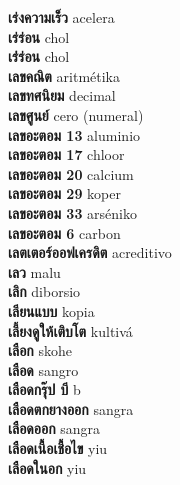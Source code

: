 \textbf{ เร่งความเร็ว  } acelera \\
\textbf{ เร่ร่อน  } chol \\
\textbf{ เร่่ร่อน  } chol \\
\textbf{ เลขคณิต  } aritmétika \\
\textbf{ เลขทศนิยม  } decimal \\
\textbf{ เลขศูนย์  } cero (numeral) \\
\textbf{ เลขอะตอม 13  } aluminio \\
\textbf{ เลขอะตอม 17  } chloor \\
\textbf{ เลขอะตอม 20  } calcium \\
\textbf{ เลขอะตอม 29  } koper \\
\textbf{ เลขอะตอม 33  } arséniko \\
\textbf{ เลขอะตอม 6  } carbon \\
\textbf{ เลตเตอร์ออฟเครดิต  } acreditivo \\
\textbf{ เลว  } malu \\
\textbf{ เลิก  } diborsio \\
\textbf{ เลียนแบบ  } kopia \\
\textbf{ เลี้ยงดูให้เติบโต  } kultivá \\
\textbf{ เลือก  } skohe \\
\textbf{ เลือด  } sangro \\
\textbf{ เลือดกรุ๊ป บี  } b \\
\textbf{ เลือดตกยางออก  } sangra \\
\textbf{ เลือดออก  } sangra \\
\textbf{ เลือดเนื้อเชื้อไข  } yiu \\
\textbf{ เลือดในอก  } yiu \\
